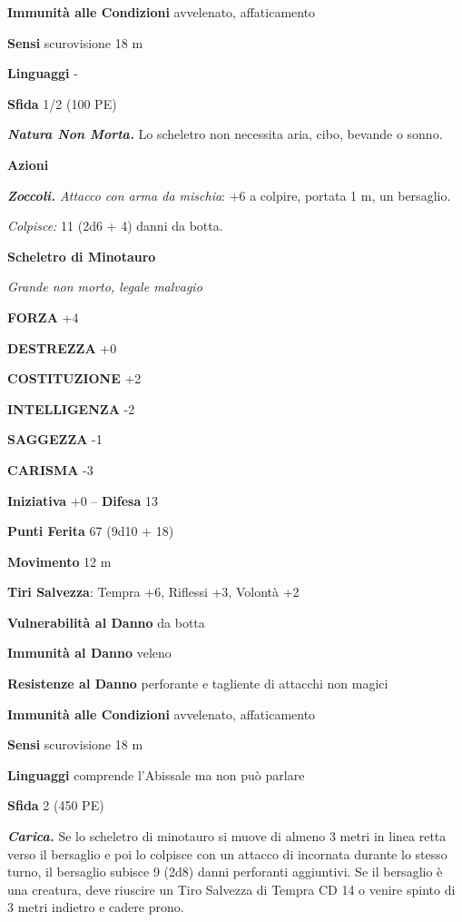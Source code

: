 \begin{multicols}{2}
\textbf{Immunità alle Condizioni} avvelenato, affaticamento

\textbf{Sensi} scurovisione 18 m 

\textbf{Linguaggi} -

\textbf{Sfida} 1/2 (100 PE)

\emph{\textbf{Natura Non Morta.}} Lo scheletro non necessita aria, cibo, bevande o sonno.

\textbf{Azioni}

\emph{\textbf{Zoccoli.} Attacco con arma da mischia}: +6 a colpire, portata 1 m, un bersaglio.

\emph{Colpisce:} 11 (2d6 + 4) danni da botta.

\medskip{}\textbf{Scheletro di Minotauro}

\emph{Grande non morto, legale malvagio}

\textbf{FORZA} +4

\textbf{DESTREZZA} +0

\textbf{COSTITUZIONE} +2

\textbf{INTELLIGENZA} -2

\textbf{SAGGEZZA} -1

\textbf{CARISMA} -3

\textbf{Iniziativa} +0 -- \textbf{Difesa} 13

\textbf{Punti Ferita} 67 (9d10 + 18)

\textbf{Movimento} 12 m

\textbf{Tiri Salvezza}: Tempra +6, Riflessi +3, Volontà +2

\textbf{Vulnerabilità al Danno} da botta

\textbf{Immunità al Danno} veleno

\textbf{Resistenze al Danno} perforante e tagliente di attacchi non magici

\textbf{Immunità alle Condizioni} avvelenato, affaticamento

\textbf{Sensi} scurovisione 18 m

\textbf{Linguaggi} comprende l'Abissale ma non può parlare

\textbf{Sfida} 2 (450 PE)

\emph{\textbf{Carica.}} Se lo scheletro di minotauro si muove di almeno 3 metri in linea retta verso il bersaglio e poi lo colpisce con un attacco di incornata durante lo stesso turno, il bersaglio subisce 9 (2d8) danni perforanti aggiuntivi. Se il bersaglio è una creatura, deve riuscire un Tiro Salvezza di Tempra CD 14 o venire spinto di 3 metri indietro e cadere prono.


\end{multicols}
